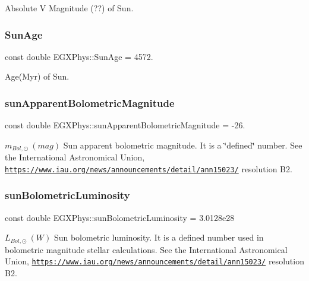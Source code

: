 Absolute V Magnitude (??) of Sun. \mbox{\label{namespace_e_g_x_phys_a173216c099d7915fb16e6416902fcbb8}} 
\subsubsection{\texorpdfstring{Sun\+Age}{SunAge}}
{\footnotesize\ttfamily const double E\+G\+X\+Phys\+::\+Sun\+Age = 4572.}

Age(\+Myr) of Sun. \mbox{\label{namespace_e_g_x_phys_a955fc5381e15741484ffe146d8eccdd8}} 
\subsubsection{\texorpdfstring{sun\+Apparent\+Bolometric\+Magnitude}{sunApparentBolometricMagnitude}}
{\footnotesize\ttfamily const double E\+G\+X\+Phys\+::sun\+Apparent\+Bolometric\+Magnitude = -\/26.}

$m_{Bol,\odot} \ (mag)$ Sun apparent bolometric magnitude. It is a \char`\"{}defined\char`\"{} number. See the International Astronomical Union, \href{https://www.iau.org/news/announcements/detail/ann15023/}{\tt https\+://www.\+iau.\+org/news/announcements/detail/ann15023/} resolution B2. \mbox{\label{namespace_e_g_x_phys_a7255d70600ab43d9a7b2544400e6da79}} 
\subsubsection{\texorpdfstring{sun\+Bolometric\+Luminosity}{sunBolometricLuminosity}}
{\footnotesize\ttfamily const double E\+G\+X\+Phys\+::sun\+Bolometric\+Luminosity = 3.\+0128e28}

$L_{Bol,\odot} \ (W)$ Sun bolometric luminosity. It is a defined number used in bolometric magnitude stellar calculations. See the International Astronomical Union, \href{https://www.iau.org/news/announcements/detail/ann15023/}{\tt https\+://www.\+iau.\+org/news/announcements/detail/ann15023/} resolution B2. \mbox{\label{namespace_e_g_x_phys_ad6c3d6fda98ef1efd005dd096890e981}} 
